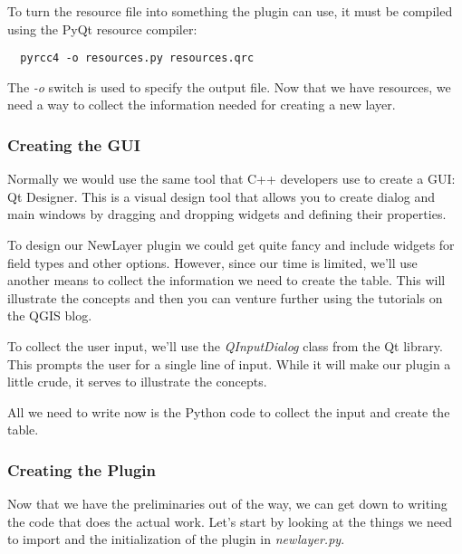 To turn the resource file into something the plugin can use, it must be compiled using the PyQt resource compiler:

\begin{verbatim}
  pyrcc4 -o resources.py resources.qrc
\end{verbatim}

The \textsl{-o} switch is used to specify the output file.
Now that we have resources, we need a way to collect the information needed for creating a new layer.

\subsubsection{Creating the GUI}

Normally we would use the same tool that C++ developers use to create a GUI: Qt Designer.
This is a visual design tool that allows you to create dialog and main windows by dragging and dropping widgets and defining their properties.

To design our NewLayer plugin we could get quite fancy and include widgets for field types and other options.
However, since our time is limited, we'll use another means to collect the information we need to create the table.
This will illustrate the concepts and then you can venture further using the tutorials on the QGIS blog.

To collect the user input, we'll use the \textsl{QInputDialog} class from the Qt library.
This prompts the user for a single line of input.
While it will make our plugin a little crude, it serves to illustrate the concepts.

All we need to write now is the Python code to collect the input and create the table.

\subsubsection{Creating the Plugin}

Now that we have the preliminaries out of the way, we can get down to writing the code that does the actual work.
Let's start by looking at the things we need to import and the initialization of the plugin in \textsl{newlayer.py}.

